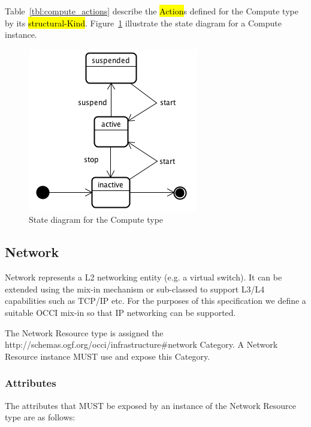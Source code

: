 \documentclass[10pt,a4paper]{article}
\begin{document}
Table~\ref{tbl:compute_actions} describe the \hl{Action}s defined for the
Compute type by its \hl{structural-Kind}.
%
%
Figure~\ref{fig:compute_state} illustrate the state diagram for a
Compute instance.

\begin{figure}[!h]
	\centering
	\includegraphics[scale=0.4]{figs/compute-state.png}
	\caption{State diagram for the Compute type}
	\label{fig:compute_state}
\end{figure}

\subsection{Network}
Network represents a L2 networking entity (e.g. a virtual switch). It can be extended using the mix-in mechanism or sub-classed to support L3/L4 capabilities such as TCP/IP etc. For the purposes of this specification we define a suitable OCCI mix-in so that IP networking can be supported. 

The Network Resource type is assigned the http://schemas.ogf.org/occi/infrastructure\#network Category. A Network Resource instance MUST use and expose this Category.

\subsubsection{Attributes}
The attributes that MUST be exposed by an instance of the Network Resource type are as follows:
\end{document}
